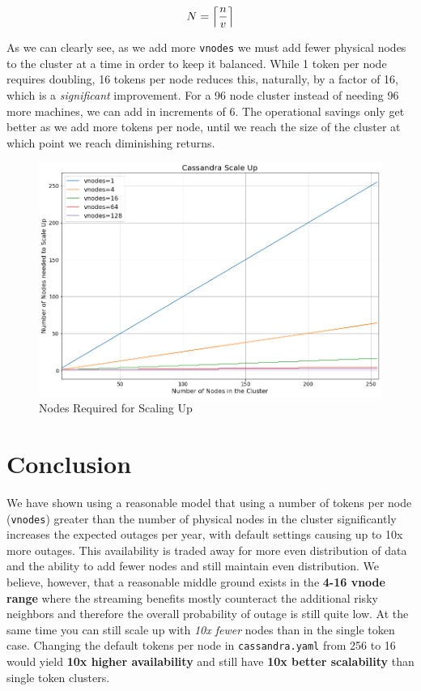 \documentclass{article}
\DeclarePairedDelimiter{\ceil}{\lceil}{\rceil}
\begin{document}
\begin{equation} \label{eq:scaling}
    N = \ceil*{\frac{n}{v}}
\end{equation}

As we can clearly see, as we add more \texttt{vnodes} we must add fewer physical nodes to the cluster at a time in order to keep it balanced. While 1 token per node requires doubling, 16 tokens per node reduces this, naturally, by a factor of 16, which is a \textit{significant} improvement. For a 96 node cluster instead of needing 96 more machines, we can add in increments of 6. The operational savings only get better as we add more tokens per node, until we reach the size of the cluster at which point we reach diminishing returns.

\begin{figure}[H]
    \centering
    \includegraphics[width=1.0\textwidth]{images/scale_up.png}
    \caption{Nodes Required for Scaling Up}
    \label{fig:scaling}
\end{figure}


\section{Conclusion}
We have shown using a reasonable model that using a number of tokens per node (\texttt{vnodes}) greater than the number of physical nodes in the cluster significantly increases the expected outages per year, with default settings causing up to 10x more outages. This availability is traded away for more even distribution of data and the ability to add fewer nodes and still maintain even distribution. We believe, however, that a reasonable middle ground exists in the \textbf{4-16 vnode range} where the streaming benefits mostly counteract the additional risky neighbors and therefore the overall probability of outage is still quite low. At the same time you can still scale up with \textit{10x fewer} nodes than in the single token case. Changing the default tokens per node in \texttt{cassandra.yaml} from 256 to 16 would yield \textbf{10x higher availability} and still have \textbf{10x better scalability} than single token clusters.
\end{document}
